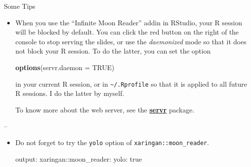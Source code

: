 \documentclass[ignorenonframetext,]{beamer}
\newenvironment{Shaded}{\begin{snugshade}}{\end{snugshade}}
\newcommand{\AttributeTok}[1]{\textcolor[rgb]{0.77,0.63,0.00}{#1}}
\newcommand{\DataTypeTok}[1]{\textcolor[rgb]{0.13,0.29,0.53}{#1}}
\newcommand{\FunctionTok}[1]{\textcolor[rgb]{0.00,0.00,0.00}{#1}}
\newcommand{\KeywordTok}[1]{\textcolor[rgb]{0.13,0.29,0.53}{\textbf{#1}}}
\newcommand{\NormalTok}[1]{#1}
\newcommand{\OtherTok}[1]{\textcolor[rgb]{0.56,0.35,0.01}{#1}}
\begin{document}
\begin{frame}[fragile]{Some Tips}
\protect\hypertarget{some-tips}{}

\begin{itemize}
\item
  When you use the ``Infinite Moon Reader'' addin in RStudio, your R
  session will be blocked by default. You can click the red button on
  the right of the console to stop serving the slides, or use the
  \emph{daemonized} mode so that it does not block your R session. To do
  the latter, you can set the option

\begin{Shaded}
\begin{Highlighting}[]
\KeywordTok{options}\NormalTok{(}\DataTypeTok{servr.daemon =} \OtherTok{TRUE}\NormalTok{)}
\end{Highlighting}
\end{Shaded}

  in your current R session, or in \texttt{\textasciitilde{}/.Rprofile}
  so that it is applied to all future R sessions. I do the latter by
  myself.

  To know more about the web server, see the
  \href{https://github.com/yihui/servr}{\textbf{servr}} package.
\end{itemize}

--

\begin{itemize}
\item
  Do not forget to try the \texttt{yolo} option of
  \texttt{xaringan::moon\_reader}.

\begin{Shaded}
\begin{Highlighting}[]
\FunctionTok{output:}
  \FunctionTok{xaringan:}\AttributeTok{:moon_reader:}
    \FunctionTok{yolo:}\AttributeTok{ true}
\end{Highlighting}
\end{Shaded}
\end{itemize}

\end{frame}
\end{document}
